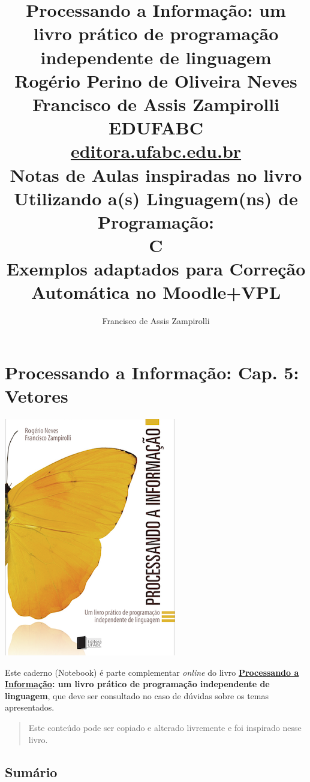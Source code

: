 \documentclass[12pt,a4paper]{article}
\title{Processando a Informação: um livro prático de programação independente de linguagem 
\\\large\vspace{2cm}
Rogério Perino de Oliveira Neves 
\\\vspace{5mm}
Francisco de Assis Zampirolli
\\\large\vspace{2cm}
EDUFABC
\\ \url{editora.ufabc.edu.br}
\\\Huge\vspace{3cm}
Notas de Aulas inspiradas no livro
\\\Large\vspace{1cm}
Utilizando a(s) Linguagem(ns) de Programação: 
\\\Huge\vspace{1cm}
C
\\\large\vspace{1cm}
Exemplos adaptados para Correção Automática no Moodle+VPL
\vspace{2cm}}
\author{Francisco de Assis Zampirolli\vspace{1cm}}
\begin{document}
    
    
\clearpage\maketitle
\thispagestyle{empty}
\tableofcontents

    
    

    
    \hypertarget{processando-a-informauxe7uxe3o-cap.-5-vetores}{%
\section{Processando a Informação: Cap. 5:
Vetores}\label{processando-a-informauxe7uxe3o-cap.-5-vetores}}

    \includegraphics{"figs/Capa_Processando_Informacao.jpg"}

Este caderno (Notebook) é parte complementar \emph{online} do livro
\textbf{\href{https://editora.ufabc.edu.br/matematica-e-ciencias-da-computacao/58-processando-a-informacao}{Processando
a Informação}: um livro prático de programação independente de
linguagem}, que deve ser consultado no caso de dúvidas sobre os temas
apresentados.

\begin{quote}
Este conteúdo pode ser copiado e alterado livremente e foi inspirado
nesse livro.
\end{quote}

    \hypertarget{sumuxe1rio}{%
\subsection{Sumário}\label{sumuxe1rio}}
\end{document}
